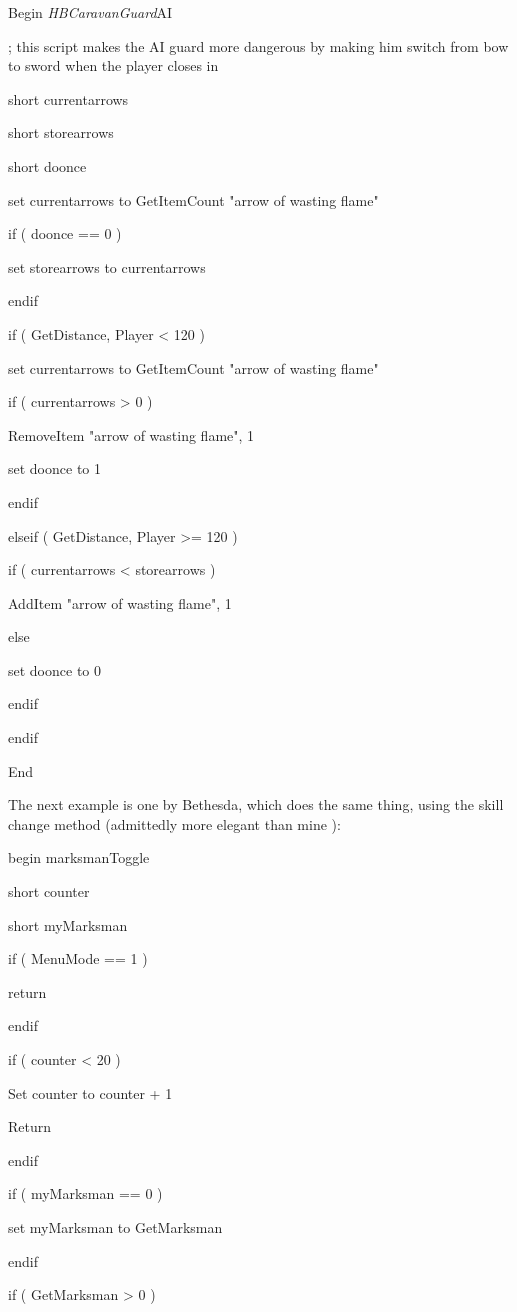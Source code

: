 \documentclass[
]{article}
\begin{document}
Begin \emph{HBCaravanGuard}AI

; this script makes the AI guard more dangerous by making him switch
from bow to sword when the player closes in

short currentarrows

short storearrows

short doonce

set currentarrows to GetItemCount "arrow of wasting flame"

if ( doonce == 0 )

set storearrows to currentarrows

endif

if ( GetDistance, Player \textless{} 120 )

set currentarrows to GetItemCount "arrow of wasting flame"

if ( currentarrows \textgreater{} 0 )

RemoveItem "arrow of wasting flame", 1

set doonce to 1

endif

elseif ( GetDistance, Player \textgreater= 120 )

if ( currentarrows \textless{} storearrows )

AddItem "arrow of wasting flame", 1

else

set doonce to 0

endif

endif

End

The next example is one by Bethesda, which does the same thing, using
the skill change method (admittedly more elegant than mine ):

begin marksmanToggle

short counter

short myMarksman

if ( MenuMode == 1 )

return

endif

if ( counter \textless{} 20 )

Set counter to counter + 1

Return

endif

if ( myMarksman == 0 )

set myMarksman to GetMarksman

endif

if ( GetMarksman \textgreater{} 0 )
\end{document}
